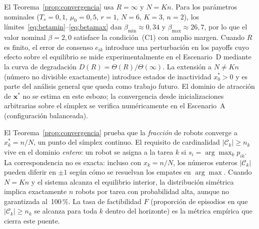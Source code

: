 \begin{observacion}
El Teorema~\ref{prop:convergencia} usa $R = \infty$ y $N = Kn$.
Para los parámetros nominales ($T_s\!=\!0{,}1$, $\mu_0\!=\!0{,}5$, $r\!=\!1$,
$N\!=\!6$, $K\!=\!3$, $n\!=\!2$), los límites~\eqref{eq:betamin}--\eqref{eq:betamax}
dan $\beta_{\min} \approx 0{,}34$ y $\beta_{\max} \approx 26{,}7$, por lo que el
valor nominal $\beta = 2{,}0$ satisface la condición~(C1) con amplio margen.
Cuando $R$ es finito, el error de consenso $e_{ik}$ introduce una perturbación
en los payoffs cuyo efecto sobre el equilibrio se mide experimentalmente en el
Escenario~D mediante la curva de degradación $D(R) = \Theta(R)/\Theta(\infty)$.
La extensión a $N \neq Kn$ (número no divisible exactamente) introduce estados
de inactividad $x_0^* > 0$ y es parte del análisis general que queda como
trabajo futuro. El dominio de atracción de $\mathbf{x}^*$ no se estima en este
esbozo; la convergencia desde inicializaciones arbitrarias sobre el símplex se
verifica numéricamente en el Escenario~A (configuración balanceada).
\end{observacion}

\begin{observacion}
\label{obs:fracciones_enteras}
El Teorema~\ref{prop:convergencia} prueba que la \emph{fracción} de robots
converge a $x_k^* = n/N$, un punto del símplex continuo. El requisito de
cardinalidad $|\mathcal{C}_k| \geq n_k$ vive en el dominio \emph{entero}: un robot
se asigna a la tarea $k$ si $s_i = \arg\max_k p_{ik}$. La correspondencia no es
exacta: incluso con $x_k = n/N$, los números enteros $|\mathcal{C}_k|$ pueden
diferir en $\pm 1$ según cómo se resuelvan los empates en $\arg\max$.
Cuando $N = Kn$ y el sistema alcanza el equilibrio interior, la
distribución simétrica implica exactamente $n$ robots por tarea con probabilidad
alta, aunque no garantizada al~100\,\%. La tasa de factibilidad $F$ (proporción de
episodios en que $|\mathcal{C}_k| \geq n_k$ se alcanza para toda $k$ dentro del
horizonte) es la métrica empírica que cierra este puente.
\end{observacion}


